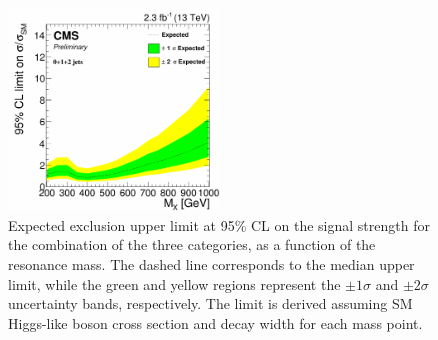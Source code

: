 \begin{figure}[!htb]
\centering
\includegraphics[width=0.5\textwidth]{images/13TeV/HighMass/exp_limit_012jet_mu.pdf}
\caption{Expected exclusion upper limit at 95\% CL on the signal strength for the combination of the three categories, as a function of the resonance mass. The dashed line corresponds to the median upper limit, while the green and yellow regions represent the $\pm 1\sigma$ and $\pm 2 \sigma$ uncertainty bands, respectively. The limit is derived assuming SM Higgs-like boson cross section and decay width for each mass point.}\label{fig:13TeVcombexplim}
\end{figure}




